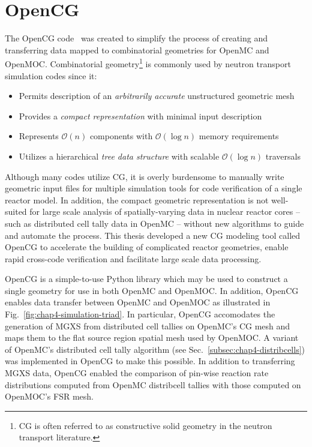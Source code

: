 

\section{OpenCG}
\label{sec:chap4-opencg}

The OpenCG code~\cite{boyd2015opencg} was created to simplify the process of creating and transferring data mapped to combinatorial geometries for OpenMC and OpenMOC. Combinatorial geometry\footnote{\ac{CG} is often referred to as constructive solid geometry in the neutron transport literature.} is commonly used by neutron transport simulation codes since it:

\begin{itemize}[noitemsep]
  \item Permits description of an \textit{arbitrarily accurate} unstructured geometric mesh
  \item Provides a \textit{compact representation} with minimal input description
  \item Represents $\mathcal{O}(n)$ components with $\mathcal{O}(\log{}n)$ memory requirements
  \item Utilizes a hierarchical \textit{tree data structure} with scalable $\mathcal{O}(\log{}n)$ traversals
\end{itemize}

\noindent Although many codes utilize \ac{CG}, it is overly burdensome to manually write geometric input files for multiple simulation tools for code verification of a single reactor model. In addition, the compact geometric representation is not well-suited for large scale analysis of spatially-varying data in nuclear reactor cores -- such as distributed cell tally data in OpenMC -- without new algorithms to guide and automate the process. This thesis developed a new \ac{CG} modeling tool called OpenCG to accelerate the building of complicated reactor geometries, enable rapid cross-code verification and facilitate large scale data processing. 

OpenCG is a simple-to-use Python library which may be used to construct a single geometry for use in both OpenMC and OpenMOC. In addition, OpenCG enables data transfer between OpenMC and OpenMOC as illustrated in Fig.~\ref{fig:chap4-simulation-triad}. In particular, OpenCG accomodates the generation of \ac{MGXS} from distributed cell tallies on OpenMC's \ac{CG} mesh and maps them to the flat source region spatial mesh used by OpenMOC. A variant of OpenMC's distributed cell tally algorithm (see Sec.~\ref{subsec:chap4-distribcells}) was implemented in OpenCG to make this possible. In addition to transferring \ac{MGXS} data, OpenCG enabled the comparison of pin-wise reaction rate distributions computed from OpenMC distribcell tallies with those computed on OpenMOC's \ac{FSR} mesh.

